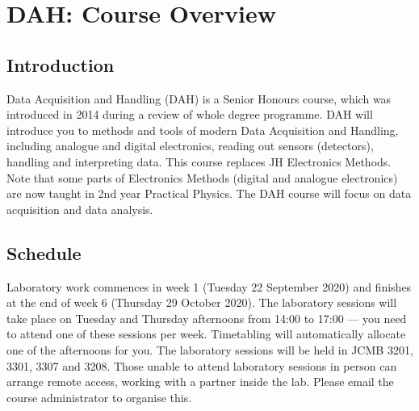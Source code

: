 \chapter{DAH: Course Overview}
\label{sec:overview}

\section{Introduction}

Data Acquisition and Handling (DAH) is a Senior Honours course, which was introduced in 2014 during a review of whole degree programme.
DAH will introduce you to methods and tools of modern Data Acquisition and Handling, including analogue and digital electronics, reading out sensors (detectors), handling and interpreting data.
This course replaces JH Electronics Methods.
Note that some parts of Electronics Methods (digital and analogue electronics) are now taught in 2nd year Practical Physics.
The DAH course will focus on data acquisition and data analysis.

\section{Schedule}

Laboratory work commences in week 1 (Tuesday 22 September 2020)
and finishes at the end of week 6 (Thursday 29 October 2020).
The laboratory sessions will take place on Tuesday and Thursday afternoons from 14:00 to 17:00 --- you need to attend one of these sessions per week.
Timetabling will automatically allocate one of the afternoons for you.
The laboratory sessions will be held in JCMB 3201, 3301, 3307 and 3208.
Those unable to attend laboratory sessions in person can arrange remote access, working with a partner inside the lab.
Please email the course administrator to organise this.

